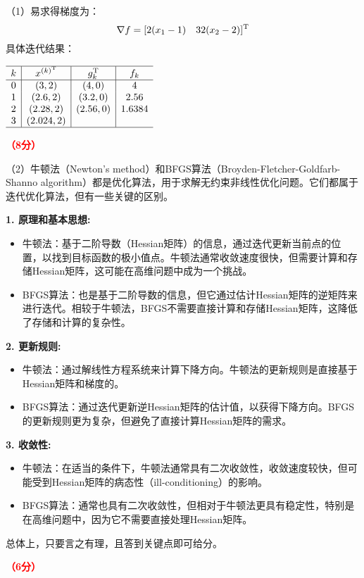 \documentclass[12pt,a4paper,openany,twoside]{ctexbook}
\begin{document}
\begin{Solution}
	（1）易求得梯度为：
	\[
	\nabla f = [2(x_1 - 1) \quad 32(x_2 - 2) ]^{\mathrm{T}}
	\]
	具体迭代结果：\\
	\begin{center}
		$\begin{array}{c|c|c|c}
			\hline k & x^{(k)^{\mathrm{T}}} &g_k^{\mathrm{T}}& f_k \\
			\hline 0 & (3,2) & (4,0) & 4  \\
			1 & (2.6,2) &(3.2, 0) & 2.56 \\
			2 & (2.28,2) & (2.56, 0) & 1.6384 \\
			3 & (2.024,2) &  &  \\
			\hline
		\end{array}$
	\end{center}

	\hfill \textcolor{red}{\textbf{（8分）}}
	
	（2）牛顿法（Newton's method）和BFGS算法（Broyden-Fletcher-Goldfarb-Shanno algorithm）都是优化算法，用于求解无约束非线性优化问题。它们都属于迭代优化算法，但有一些关键的区别。
	
	\textbf{1. 原理和基本思想:}
	\begin{itemize}
		\item 牛顿法：基于二阶导数（Hessian矩阵）的信息，通过迭代更新当前点的位置，以找到目标函数的极小值点。牛顿法通常收敛速度很快，但需要计算和存储Hessian矩阵，这可能在高维问题中成为一个挑战。
		
		\item BFGS算法：也是基于二阶导数的信息，但它通过估计Hessian矩阵的逆矩阵来进行迭代。相较于牛顿法，BFGS不需要直接计算和存储Hessian矩阵，这降低了存储和计算的复杂性。
	\end{itemize}
	
	\textbf{2. 更新规则:}
	\begin{itemize}
		\item 牛顿法：通过解线性方程系统来计算下降方向。牛顿法的更新规则是直接基于Hessian矩阵和梯度的。
		
		\item BFGS算法：通过迭代更新逆Hessian矩阵的估计值，以获得下降方向。BFGS的更新规则更为复杂，但避免了直接计算Hessian矩阵的需求。
	\end{itemize}
	
	\textbf{3. 收敛性:}
	\begin{itemize}
		\item 牛顿法：在适当的条件下，牛顿法通常具有二次收敛性，收敛速度较快，但可能受到Hessian矩阵的病态性（ill-conditioning）的影响。
		
		\item BFGS算法：通常也具有二次收敛性，但相对于牛顿法更具有稳定性，特别是在高维问题中，因为它不需要直接处理Hessian矩阵。
	\end{itemize}
	
	总体上，只要言之有理，且答到关键点即可给分。
	
	\hfill \textcolor{red}{\textbf{（6分）}}
\end{Solution}
\end{document}
